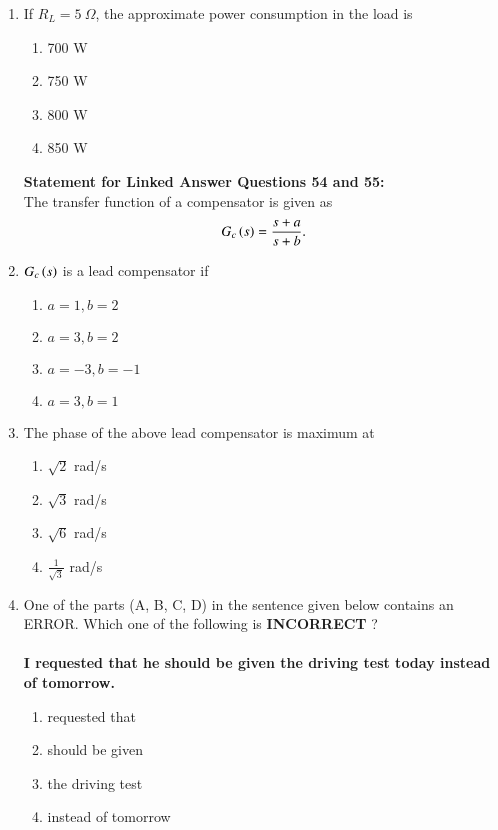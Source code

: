 \documentclass[journal]{IEEEtran}
\begin{document}
\begin{enumerate}
\item If $R_L = 5\ \Omega$, the approximate power consumption in the load is 
    \begin{enumerate}
      \item 700 W
      \item 750 W
      \item 800 W
      \item 850 W \\
    \end{enumerate}
\textbf{Statement for Linked Answer Questions 54 and 55:}\\
The transfer function of a compensator is given as
\begin{align*}
    G_c\left(s\right) = \frac{s+a}{s+b}.
\end{align*}
\item $G_c\left(s\right)$ is a lead compensator if 
\begin{enumerate}
    \item $a = 1, b = 2$
    \item $a = 3, b = 2$
    \item $a = -3, b = -1$
    \item $a = 3, b = 1$ \\
\end{enumerate}
\item The phase of the above lead compensator is maximum at
\begin{enumerate}
    \item $\sqrt{2}$ rad/s
    \item $\sqrt{3}$ rad/s
    \item $\sqrt{6}$ rad/s
    \item $\frac{1}{\sqrt{3}}$ rad/s \\
\end{enumerate}
\item One of the parts (A, B, C, D) in the sentence given below contains an ERROR. Which one of the following is \textbf{INCORRECT} ?\\\\
\textbf{I requested that he should be given the driving test today instead of tomorrow.}
 \begin{enumerate}
     \item requested that
     \item should be given
     \item the driving test
     \item instead of tomorrow \\

\end{enumerate}
\end{enumerate}
\end{document}
